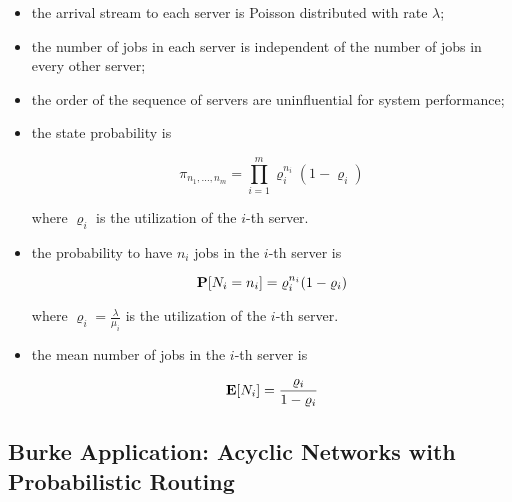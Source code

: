 \begin{itemize}
	\item the arrival stream to each server is Poisson distributed with rate $\lambda$;
	
	\item the number of jobs in each server is independent of the number of jobs in every other server;
	
	\item the order of the sequence of servers are uninfluential for system performance;
	
	\item the state probability is
	
	\begin{equation}
	\label{eqn:Burke-Application-Tandem-Systems-Probability-State}
	\pi_{n_{1},...,n_{m}} = \prod_{i=1}^{m} \varrho_{i}^{n_{i}} (1 - \varrho_{i})
	\end{equation}
	
	where $\varrho_{i}$ is the utilization of the $i$-th server.
	
	\item the probability to have $n_{i}$ jobs in the $i$-th server is
	
	\begin{equation}
	\label{eqn:Burke-Application-Tandem-Systems-Probability-Jobs-Server}
	\probability{N_{i}=n_{i}} = \varrho_{i}^{n_{i}} (1 - \varrho_{i})
	\end{equation}
	
	where $\varrho_{i}=\frac{\lambda}{\mu_{i}}$ is the utilization of the $i$-th server.
	
	\item the mean number of jobs in the $i$-th server is
	
	\begin{equation}
	\label{eqn:Burke-Application-Tandem-Systems-Expected-Jobs-Server}
	\expected{N_{i}} = \frac{\varrho_{i}}{1-\varrho_{i}}
	\end{equation}
\end{itemize}





\subsection{Burke Application: Acyclic Networks with Probabilistic Routing}
\label{sec:Burke-Application-Acyclic-Networks-Probabilistic-Routing}

